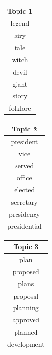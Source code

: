 \documentclass{article}
\begin{document}
\begin{figure}[ht]
    \vspace{-3mm}
    \centering
    \begin{subfigure}[b]{0.15\textwidth}
    \centering
    \begin{tabular}[b]{c}
    \textbf{Topic 1} \\ \hline
     legend \\
       airy\\
       tale\\
       witch\\
       devil\\
       giant\\
      story\\
      folklore\\
      \end{tabular}
    \end{subfigure}
    \begin{subfigure}[b]{0.15\textwidth}
    \centering
     \begin{tabular}[b]{c}
      \textbf{Topic 2} \\ \hline
      president   \\
      vice   \\
      served   \\
      office  \\
      elected   \\
      secretary \\
      presidency   \\
      presidential   \\
      \end{tabular}
    \end{subfigure}
    \begin{subfigure}[b]{0.15\textwidth}
    \centering
    \begin{tabular}[b]{c}
      \textbf{Topic 3} \\ \hline
       plan   \\
       proposed   \\
       plans   \\
       proposal   \\
       planning   \\
       approved   \\
       planned   \\
       development   \\
    \end{tabular}
    \end{subfigure}
    \begin{subfigure}[b]{0.15\textwidth}

\end{subfigure}
\end{figure}
\end{document}
